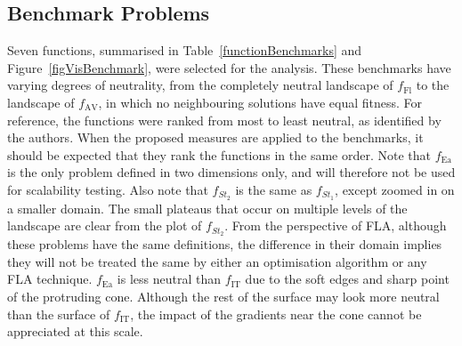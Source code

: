 \documentclass[conference]{IEEEtran}
\begin{document}
\subsection{Benchmark Problems}
\label{visualBenchmarks}
Seven functions, summarised in Table~\ref{functionBenchmarks} and Figure~\ref{figVisBenchmark}, were selected for the analysis. These benchmarks have varying degrees of neutrality, from the completely neutral landscape of $f_{\text{Fl}}$  to the landscape of $f_{\text{AV}}$, in which no neighbouring solutions have equal fitness. For reference, the functions were ranked from most to least neutral, as identified by the authors. When the proposed measures are applied to the benchmarks, it should be expected that they rank the functions in the same order. Note that $f_{\text{Ea}}$ is the only problem defined in two dimensions only, and will therefore not be used for scalability testing. Also note that $f_{\textit{St}_2}$ is the same as $f_{\textit{St}_1}$, except zoomed in on a smaller domain. The small plateaus that occur on multiple levels of the landscape are clear from the plot of $f_{\textit{St}_2}$. From the perspective of FLA, although these problems have the same definitions, the difference in their domain implies they will not be treated the same by either an optimisation algorithm or any FLA technique. $f_{\text{Ea}}$ is less neutral than $f_{\text{IT}}$ due to the soft edges and sharp point of the protruding cone. Although the rest of the surface may look more neutral than the surface of $f_{\text{IT}}$, the impact of the gradients near the cone cannot be appreciated at this scale.
\end{document}
